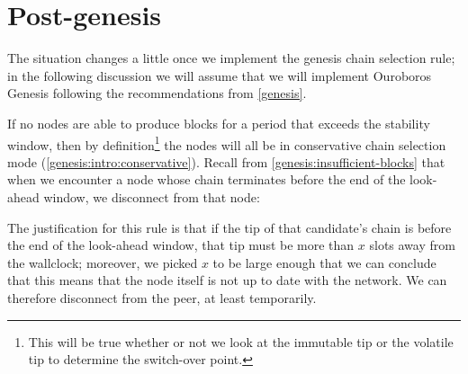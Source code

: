 \section{Post-genesis}
\label{low-density:post-genesis}

The situation changes a little once we implement the genesis chain selection
rule; in the following discussion we will assume that we will implement
Ouroboros Genesis following the recommendations from \cref{genesis}.

If no nodes are able to produce blocks for a period that exceeds the stability
window, then by definition\footnote{This will be true whether or not we look at
the immutable tip or the volatile tip to determine the switch-over point.} the
nodes will all be in conservative chain selection mode
(\cref{genesis:intro:conservative}). Recall from
\cref{genesis:insufficient-blocks} that when we encounter a node whose chain
terminates before the end of the look-ahead window, we disconnect from that
node:
%
\begin{center}
\end{center}
%
The justification for this rule is that if the tip of that candidate's chain is
before the end of the look-ahead window, that tip must be more than $x$ slots
away from the wallclock; moreover,  we picked $x$ to be large enough that we can
conclude that this means that the node itself is not up to date with the
network. We can therefore disconnect from the peer, at least temporarily.

